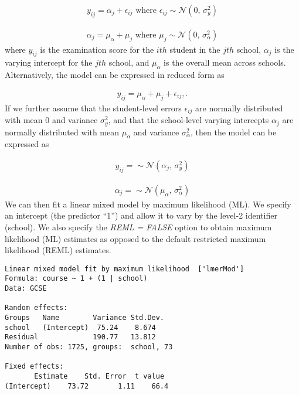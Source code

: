 \begin{align}
	y_{ij} = \alpha_j + \epsilon_{ij} \text{ where } \epsilon_{ij} \sim \mathcal{N}(0,\,\sigma^{2}_y)
\end{align}

\begin{align}
	\alpha_j = \mu_\alpha + \mu_j \text{ where } \mu_j \sim \mathcal{N}(0,\,\sigma^{2}_\alpha)
\end{align}
where $y_{ij}$ is the examination score for the $ith$ student in the $jth$ school, $\alpha_j$ is the varying intercept for the $jth$ school, and $\mu_\alpha$ is the overall mean across schools. Alternatively, the model can be expressed in reduced form as

\begin{align}
	y_{ij} = \mu_\alpha + \mu_j + \epsilon_{ij},.
\end{align}
If we further assume that the student-level errors $\epsilon_{ij}$ are normally distributed with mean $0$ and variance $\sigma^{2}_y$, and that the school-level varying intercepts $\alpha_j$ are normally distributed with mean $\mu_\alpha$ and variance $\sigma^{2}_\alpha$, then the model can be expressed as

\begin{align}
	y_{ij} =  \sim \mathcal{N}(\alpha_j,\,\sigma^{2}_y)
\end{align}

\begin{align}
	\alpha_j =  \sim \mathcal{N}(\mu_\alpha,\,\sigma^{2}_\alpha)
\end{align}
We can then fit a linear mixed model by maximum likelihood (ML). 
We specify an intercept (the predictor “1”) and allow it to vary by the level-2 identifier (school). We also specify the \textit{REML = FALSE} option to obtain maximum likelihood (ML) estimates as opposed to the default restricted maximum likelihood (REML) estimates.

\begin{Verbatim}[frame=single]
Linear mixed model fit by maximum likelihood  ['lmerMod']
Formula: course ~ 1 + (1 | school)
Data: GCSE

Random effects:
Groups   Name        Variance Std.Dev.
school   (Intercept)  75.24    8.674  
Residual             190.77   13.812  
Number of obs: 1725, groups:  school, 73

Fixed effects:
	   Estimate    Std. Error  t value
(Intercept)    73.72       1.11    66.4

\end{Verbatim}

